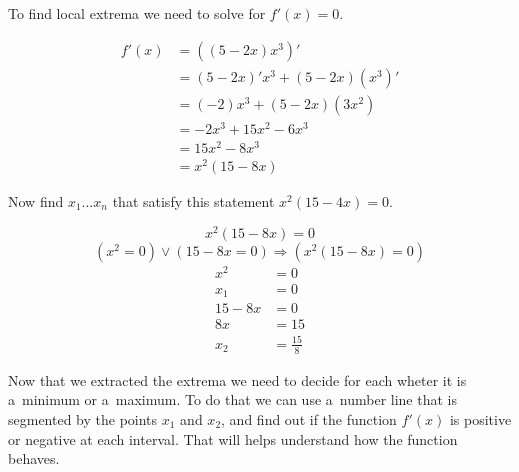 To find local extrema we need to solve for $f'(x) = 0$.
    
        \begin{align}
        f'(x) &= \left( (5-2x)x^{3} \right)' \\
        &= (5-2x)'x^{3} + (5-2x)(x^{3})' \\
        &= (-2)x^{3} + (5-2x)(3x^{2}) \\
        &= -2x^{3} + 15x^{2} - 6x^{3} \\
        &= 15x^{2} - 8x^{3} \\
        &= x^{2}(15 - 8x)
        \end{align}

        Now find $x_{1} \ldots x_{n}$ that 
        satisfy this statement $x^{2}(15 - 4x) = 0$.

        $$ x^{2}(15 - 8x) = 0 $$
        $$ (x^{2} = 0) \vee (15 - 8x = 0) 
        \Rightarrow (x^{2}(15 - 8x) = 0) $$
        \begin{align}
            x^{2} &= 0 \\
            x_{1} &= 0 \\[10pt]
            15 - 8x &= 0 \\
            8x &= 15 \\
            x_{2} &= \frac{15}{8}
        \end{align}
        
        Now that we extracted the extrema we need to 
        decide for each wheter it is a~minimum or a~maximum.
        To do that we can use a~number line that is segmented
        by the points $x_{1}$ and $x_{2}$, and find out if 
        the function $f'(x)$ is positive or negative at each
        interval. That will helps understand how the function 
        behaves.    

        \vspace{10pt}

        \begin{center}
        \end{center}
        

